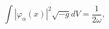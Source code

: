 \begin{equation}
\int \left| \varphi _{\alpha }(x)\right| ^{2}\sqrt{-g}dV=\frac{1}{2\omega },
\label{normcond}
\end{equation}

